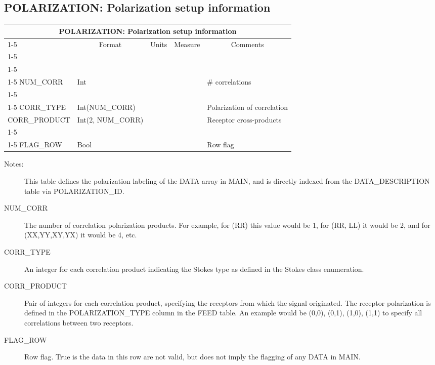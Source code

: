 \documentclass{article}
\newcommand{\defline}[1]{\cline{1-5}
\multicolumn{5}{|l|}{#1} \\
\cline{1-5}}
\newcommand{\definetable}[2]
{
	\vfill\newpage
	\subsection{#1}
        \vspace{0.15in}
        \small
	\begin{tabular}{|l|p{1.25in}|l|p{.9in}|p{1.4in}|}
	\hline
	\multicolumn{5}{|c|}{\bf #1}\\ 
	\cline{1-5}
        \multicolumn{1}{|c|}{Name}&\multicolumn{1}{|c|}{Format}&
        \multicolumn{1}{|c|}{Units}&\multicolumn{1}{|c|}{Measure}&
        \multicolumn{1}{|c|}{Comments}\\
        \cline{1-5}
        #2
        \hline
	\end{tabular}
}
\begin{document}
\definetable{POLARIZATION: Polarization setup information}{
\defline{\bf Columns}
\defline{\em Data description columns}
NUM\_CORR   &     Int  &           &        & \# correlations\\
\defline{\em Data}  
CORR\_TYPE & Int(NUM\_CORR) & & & Polarization of correlation \\
CORR\_PRODUCT &  Int(2, NUM\_CORR) &  & & Receptor cross-products \\  
\defline{\em Flags}
FLAG\_ROW & Bool & & & Row flag\\
}
\begin{description}

\item[Notes:] This table defines the polarization labeling of the DATA
array in MAIN, and is directly indexed from the DATA\_DESCRIPTION
table via POLARIZATION\_ID.

\item[NUM\_CORR] The number of correlation polarization products. For
example, for (RR) this value would be 1, for (RR, LL) it would be 2,
and for (XX,YY,XY,YX) it would be 4, etc.

\item[CORR\_TYPE] An integer for each correlation product indicating
the Stokes type as defined in the Stokes class enumeration.

\item[CORR\_PRODUCT] Pair of integers for each correlation product,
specifying the receptors from which the signal originated.  The
receptor polarization is defined in the POLARIZATION\_TYPE column in
the FEED table. An example would be (0,0), (0,1), (1,0), (1,1) to
specify all correlations between two receptors.

\item[FLAG\_ROW] Row flag. True is the data in this row are not valid,
but does not imply the flagging of any DATA in MAIN.

\end{description}
\end{document}
